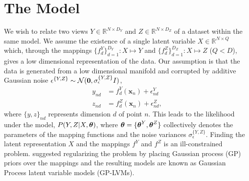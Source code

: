 \section{The Model \label{model}}

We wish to relate two views $Y \in \mathbb{R}^{N\times D_Y}$ and
$Z\in\mathbb{R}^{N\times D_Z}$ of a dataset within the same model. We
assume the existence of a single latent variable $X\in
\mathbb{R}^{N\times Q}$ which, through the mappings
$\{f^Y_d\}_{d=1}^{D_Y}: X \mapsto Y$ and $\{f^Z_d\}_{d=1}^{D_Z}: X
\mapsto Z$ ($Q<D$), gives a low dimensional representation of the
data. Our assumption is that the data is generated from a low
dimensional manifold and corrupted by additive Gaussian noise
$\epsilon^{\{Y,Z\}} \sim \mathcal{N}(\mathbf{0}, \sigma^{\{Y,Z\}}_{\epsilon} I)$,
\begin{align}
  y_{nd} &= f^Y_d(\mathbf{x}_n) + \epsilon^Y_{nd}\nonumber\\
  z_{nd} &= f^Z_d(\mathbf{x}_n) + \epsilon^Z_{nd},
\end{align}
where $\{y,z\}_{nd}$ represents dimension $d$ of point $n$.  This
leads to the likelihood under the model, $P(Y,Z|X,\boldsymbol \theta)$, where
$\boldsymbol \theta = \{\boldsymbol \theta^Y, \boldsymbol \theta^Z\}$ collectively denotes the 
parameters of the mapping functions and the noise variances $\sigma_{\epsilon}^{\{Y,Z\}}$.
Finding the latent representation $X$ and the mappings
$f^Y$ and $f^Z$ is an ill-constrained problem. \citet{Lawrence:2005vk}
suggested regularizing the problem by placing Gaussian process (GP)
\cite{Rasmussen:book06} priors over the mappings and the resulting models
are known as Gaussian Process latent variable models (GP-LVMs).

